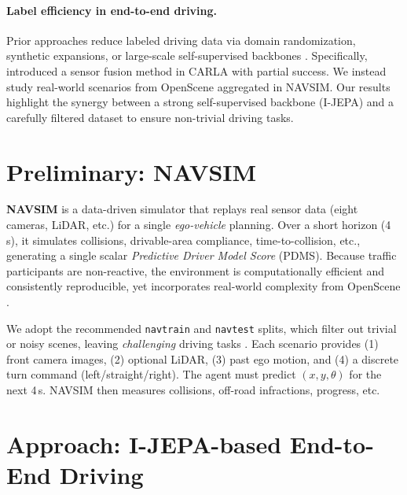 \documentclass{article}
\begin{document}
\paragraph{Label efficiency in end-to-end driving.}
Prior approaches reduce labeled driving data via domain randomization, synthetic expansions, or large-scale self-supervised backbones \cite{chen2020simple, he2022mae}. Specifically, \cite{chitta2023transfuser} introduced a sensor fusion method in CARLA with partial success. We instead study real-world scenarios from OpenScene \cite{OpenScene2023} aggregated in NAVSIM. Our results highlight the synergy between a strong self-supervised backbone (I-JEPA) and a carefully filtered dataset to ensure non-trivial driving tasks.

\section{Preliminary: NAVSIM}
\label{sec:navsim}
\textbf{NAVSIM} \cite{dauner2024navsim} is a data-driven simulator that replays real sensor data (eight cameras, LiDAR, etc.) for a single \emph{ego-vehicle} planning. Over a short horizon (4\,s), it simulates collisions, drivable-area compliance, time-to-collision, etc., generating a single scalar \emph{Predictive Driver Model Score} (PDMS). Because traffic participants are non-reactive, the environment is computationally efficient and consistently reproducible, yet incorporates real-world complexity from OpenScene \cite{OpenScene2023}.

We adopt the recommended \texttt{navtrain} and \texttt{navtest} splits, which filter out trivial or noisy scenes, leaving \emph{challenging} driving tasks \cite{dauner2024navsim}. Each scenario provides (1) front camera images, (2) optional LiDAR, (3) past ego motion, and (4) a discrete turn command (left/straight/right). The agent must predict $(x,y,\theta)$ for the next 4\,s. NAVSIM then measures collisions, off-road infractions, progress, etc.

\section{Approach: I-JEPA-based End-to-End Driving}

\end{document}
